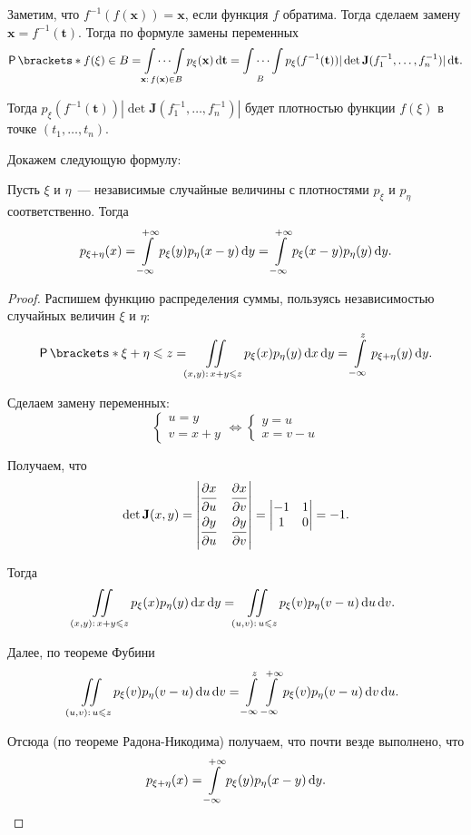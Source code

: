 Заметим, что \(f^{-1}(f(\mathbf{x})) = \mathbf{x}\), если функция \(f\) 
обратима. Тогда сделаем замену \(\mathbf{x} = f^{-1}(\mathbf{t})\). Тогда по 
формуле замены переменных
\[
\Pr{f(\xi) \in B} = \idotsint\limits_{\mathbf{x}:\,f(\mathbf{x}) \in B} 
p_{\xi}(\mathbf{x}) \diff\mathbf{t} = \idotsint\limits_{B} 
p_{\xi}(f^{-1}(\mathbf{t}))|\det \mathbf{J}(f^{-1}_1, \dots, f^{-1}_n)| 
\diff\mathbf{t}.
\]

Тогда \(p_{\xi}(f^{-1}(\mathbf{t}))|\det \mathbf{J}(f^{-1}_1, \dots, 
f^{-1}_n)|\) будет плотностью функции \(f(\xi)\) в точке \((t_1, \dots, t_n)\).

Докажем следующую формулу:
\begin{theorem}
	Пусть \(\xi\) и \(\eta\)~--- независимые случайные величины с плотностями 
	\(p_{\xi}\) и \(p_{\eta}\) соответственно. Тогда
	\[
	p_{\xi + \eta}(x) = \int\limits_{-\infty}^{+\infty} p_{\xi}(y)p_{\eta}(x - 
	y)\mathop{}\!\mathrm{d} y = \int\limits_{-\infty}^{+\infty} p_{\xi}(x - y)p_{\eta}(y)\mathop{}\!\mathrm{d} 
	y.
	\]
\end{theorem}
\begin{proof}
	Распишем функцию распределения суммы, пользуясь независимостью случайных 
	величин \(\xi\) и \(\eta\): 
	\[
	\Pr{\xi + \eta \leq z} = \iint\limits_{(x, y):\,x + y \leq z} 
	p_{\xi}(x)p_{\eta}(y)\diff x \diff y = \int\limits_{-\infty}^{z} p_{\xi + 
	\eta}(y)\diff y.
	\]
	
	Сделаем замену переменных:
	\[
	\begin{cases}
	u = y \\
	v = x + y
	\end{cases}
	\iff
	\begin{cases}
	y = u \\
	x = v - u
	\end{cases}
	\]
	
	Получаем, что 
	\[
	\det \mathbf{J}(x, y) = 
	\begin{vmatrix}
	\dfrac{\strut\partial x}{\strut\partial u} & \dfrac{\strut\partial 
	x}{\strut\partial v} \\
	\dfrac{\strut\partial y}{\strut\partial u} & \dfrac{\strut\partial 
	y}{\strut\partial v}
	\end{vmatrix} =
	\begin{vmatrix}
	-1 & 1 \\
	1 & 0
	\end{vmatrix}
	= -1.
	\]
	
	Тогда
	\[
	\iint\limits_{(x, y):\,x + y \leqslant z} p_{\xi}(x)p_{\eta}(y)\mathop{}\!\mathrm{d} x \mathop{}\!\mathrm{d} y = 
	\iint\limits_{(u, v):\,u \leqslant z} p_{\xi}(v)p_{\eta}(v - u)\mathop{}\!\mathrm{d} u \mathop{}\!\mathrm{d} v.
	\]
	
	Далее, по теореме Фубини
	\[
	\iint\limits_{(u, v):\,u \leqslant z} p_{\xi}(v)p_{\eta}(v - u)\mathop{}\!\mathrm{d} u \mathop{}\!\mathrm{d} v = 
	\int\limits_{-\infty}^{z}\int\limits_{-\infty}^{+\infty} 
	p_{\xi}(v)p_{\eta}(v - u)\mathop{}\!\mathrm{d} v \mathop{}\!\mathrm{d} u.
	\]
	
	Отсюда (по теореме Радона-Никодима) получаем, что почти везде выполнено, что
	\[
	p_{\xi + \eta}(x) = \int\limits_{-\infty}^{+\infty} p_{\xi}(y)p_{\eta}(x - 
	y)\mathop{}\!\mathrm{d} y.\qedhere
	\]
\end{proof}

